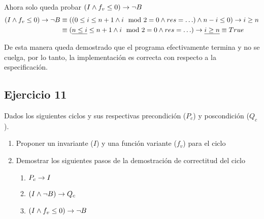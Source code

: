\begin{enumerate}[label=\alph*)]
          Ahora solo queda probar $(I \land f_v \leq 0) \rightarrow \neg B$
          \begin{align*}
              (I \land f_v \leq 0) \rightarrow \neg B & \equiv ((0 \leq i \leq n + 1 \land i \mod 2 = 0 \land res = \ldots) \land n - i \leq 0) \rightarrow i \geq n                \\
                                                & \equiv (\underline{n \leq i} \leq n + 1 \land i \mod 2 = 0 \land res = \ldots) \rightarrow \underline{i \geq n} \equiv True
          \end{align*}

          De esta manera queda demostrado que el programa efectivamente termina y no se cuelga, por lo tanto, la implementación es correcta con respecto a la especificación.
\end{enumerate}

\subsection{Ejercicio 11}
Dados los siguientes ciclos y sus respectivas precondición ($P_c$) y poscondición ($Q_c$).

\begin{enumerate}
    \item Proponer un invariante ($I$) y una función variante ($f_v$) para el ciclo
    \item Demostrar los siguientes pasos de la demostración de correctitud del ciclo

          \begin{enumerate}[label=\roman*)]
              \item $P_c \rightarrow I$
              \item $(I \land \neg B) \rightarrow Q_c$
              \item $(I \land f_v \leq 0) \rightarrow \neg B$
          \end{enumerate}
\end{enumerate}

